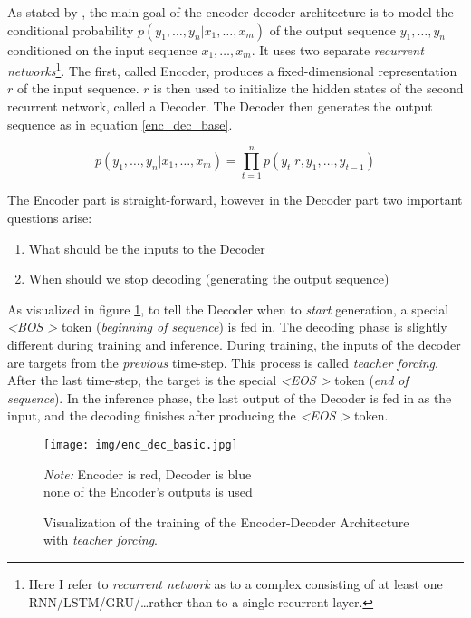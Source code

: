 As stated by \citep{sutskever2014sequence}, the main goal of the encoder-decoder architecture is to model the conditional probability $p(y_1,\dots,y_n | x_1,\dots,x_m)$ of the output sequence $y_1,\dots,y_n$ conditioned on the input sequence $x_1,\dots,x_m$. It uses two separate \emph{recurrent networks}\footnote{Here I refer to \emph{recurrent network} as to a complex consisting of at least one RNN/LSTM/GRU/\dots rather than to a single recurrent layer.}. The first, called Encoder, produces a fixed-dimensional representation $r$ of the input sequence. $r$ is then used to initialize the hidden states of the second recurrent network, called a Decoder. The Decoder then generates the output sequence as in equation \ref{enc_dec_base}.

\begin{equation} \label{enc_dec_base}
p(y_1,\dots,y_n | x_1,\dots,x_m) = \prod_{t=1}^{n}{p(y_t | r, y_1,\dots,y_{t-1})}
\end{equation}

The Encoder part is straight-forward, however in the Decoder part two important questions arise:
\begin{enumerate}
    \item What should be the inputs to the Decoder
    \item When should we stop decoding (generating the output sequence)
\end{enumerate}

As visualized in figure \ref{enc_dec_visualization}, to tell the Decoder when to \emph{start} generation, a special \emph{\textless BOS \textgreater} token (\emph{beginning of sequence}) is fed in. The decoding phase is slightly different during training and inference. During training, the inputs of the decoder are targets from the \emph{previous} time-step. This process is called \emph{teacher forcing}. After the last time-step, the target is the special \emph{\textless EOS \textgreater} token (\emph{end of sequence}). In the inference phase, the last output of the Decoder is fed in as the input, and the decoding finishes after producing the \emph{\textless EOS \textgreater} token.

\begin{figure}[!h]
    \centering
    \texttt{[image: img/enc\_dec\_basic.jpg]}

    \footnotesize{\textit{Note:} Encoder is red, Decoder is blue \\ }
    \footnotesize{none of the Encoder's outputs is used}
    \caption{\centering Visualization of the training of the Encoder-Decoder Architecture with \emph{teacher forcing}.} \label{enc_dec_visualization}
\end{figure}

